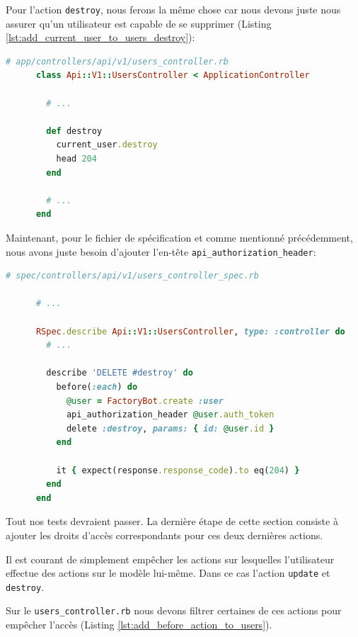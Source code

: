 \documentclass[]{report}
\begin{document}
    Pour l'action \verb|destroy|, nous ferons la même chose car nous devons juste nous assurer qu'un utilisateur est capable de se supprimer (Listing \ref{lst:add_current_user_to_users_destroy}):

    \begin{scriptsize}
      \begin{lstlisting}[language=ruby, label={lst:add_current_user_to_users_destroy}, caption={Mise à jour de l'action Users\#Destroy}]
      # app/controllers/api/v1/users_controller.rb
      class Api::V1::UsersController < ApplicationController

        # ...

        def destroy
          current_user.destroy
          head 204
        end

        # ...
      end
      \end{lstlisting}
    \end{scriptsize}

    Maintenant, pour le fichier de spécification et comme mentionné précédemment, nous avons juste besoin d'ajouter l'en-tête \verb|api_authorization_header|:

    \begin{scriptsize}
      \begin{lstlisting}[language=ruby]
      # spec/controllers/api/v1/users_controller_spec.rb

      # ...

      RSpec.describe Api::V1::UsersController, type: :controller do
        # ...

        describe 'DELETE #destroy' do
          before(:each) do
            @user = FactoryBot.create :user
            api_authorization_header @user.auth_token
            delete :destroy, params: { id: @user.id }
          end

          it { expect(response.response_code).to eq(204) }
        end
      end
      \end{lstlisting}
    \end{scriptsize}

    Tout nos tests devraient passer. La dernière étape de cette section consiste à ajouter les droits d'accès correspondants pour ces deux dernières actions.

    Il est courant de simplement empêcher les actions sur lesquelles l'utilisateur effectue des actions sur le modèle lui-même. Dans ce cas l'action \verb|update| et \verb|destroy|.

    Sur le \verb|users_controller.rb| nous devons filtrer certaines de ces actions pour empêcher l'accès (Listing \ref{lst:add_before_action_to_users}).
\end{document}
